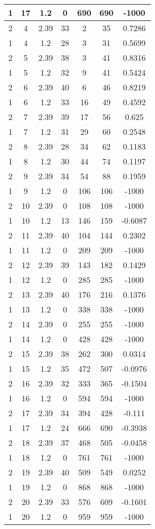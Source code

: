 \documentclass[letterpaper, 12pt]{article}
\begin{document}
\begin{longtable}{|c|c|c|c|c|c|c|}
\hline
1 & 17 & 1.2 & 0 & 690 & 690 & -1000 \\
\hline
2 & 4 & 2.39 & 33 & 2 & 35 & 0.7286 \\
\hline
1 & 4 & 1.2 & 28 & 3 & 31 & 0.5699 \\
\hline
2 & 5 & 2.39 & 38 & 3 & 41 & 0.8316 \\
\hline
1 & 5 & 1.2 & 32 & 9 & 41 & 0.5424 \\
\hline
2 & 6 & 2.39 & 40 & 6 & 46 & 0.8219 \\
\hline
1 & 6 & 1.2 & 33 & 16 & 49 & 0.4592 \\
\hline
2 & 7 & 2.39 & 39 & 17 & 56 & 0.625 \\
\hline
1 & 7 & 1.2 & 31 & 29 & 60 & 0.2548 \\
\hline
2 & 8 & 2.39 & 28 & 34 & 62 & 0.1183 \\
\hline
1 & 8 & 1.2 & 30 & 44 & 74 & 0.1197 \\
\hline
2 & 9 & 2.39 & 34 & 54 & 88 & 0.1959 \\
\hline
1 & 9 & 1.2 & 0 & 106 & 106 & -1000 \\
\hline
2 & 10 & 2.39 & 0 & 108 & 108 & -1000 \\
\hline
1 & 10 & 1.2 & 13 & 146 & 159 & -0.6087 \\
\hline
2 & 11 & 2.39 & 40 & 104 & 144 & 0.2302 \\
\hline
1 & 11 & 1.2 & 0 & 209 & 209 & -1000 \\
\hline
2 & 12 & 2.39 & 39 & 143 & 182 & 0.1429 \\
\hline
1 & 12 & 1.2 & 0 & 285 & 285 & -1000 \\
\hline
2 & 13 & 2.39 & 40 & 176 & 216 & 0.1376 \\
\hline
1 & 13 & 1.2 & 0 & 338 & 338 & -1000 \\
\hline
2 & 14 & 2.39 & 0 & 255 & 255 & -1000 \\
\hline
1 & 14 & 1.2 & 0 & 428 & 428 & -1000 \\
\hline
2 & 15 & 2.39 & 38 & 262 & 300 & 0.0314 \\
\hline
1 & 15 & 1.2 & 35 & 472 & 507 & -0.0976 \\
\hline
2 & 16 & 2.39 & 32 & 333 & 365 & -0.1504 \\
\hline
1 & 16 & 1.2 & 0 & 594 & 594 & -1000 \\
\hline
2 & 17 & 2.39 & 34 & 394 & 428 & -0.111 \\
\hline
1 & 17 & 1.2 & 24 & 666 & 690 & -0.3938 \\
\hline
2 & 18 & 2.39 & 37 & 468 & 505 & -0.0458 \\
\hline
1 & 18 & 1.2 & 0 & 761 & 761 & -1000 \\
\hline
2 & 19 & 2.39 & 40 & 509 & 549 & 0.0252 \\
\hline
1 & 19 & 1.2 & 0 & 868 & 868 & -1000 \\
\hline
2 & 20 & 2.39 & 33 & 576 & 609 & -0.1601 \\
\hline
1 & 20 & 1.2 & 0 & 959 & 959 & -1000 \\
\hline
\end{longtable}
\end{document}
